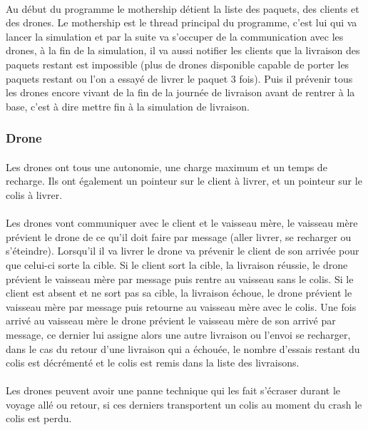\documentclass[article, backcover, french, nodocumentinfo]{upmethodology-document}
\begin{document}
				\paragraph*{}
					Au début du programme le mothership détient la liste des paquets, des clients et des drones. Le mothership est le thread principal du programme, c'est lui qui va lancer la simulation et par la suite va s'occuper de la communication avec les drones, à la fin de la simulation, il va aussi notifier les clients que la livraison des paquets restant est impossible (plus de drones disponible capable de porter les paquets restant ou l'on a essayé de livrer le paquet 3 fois). Puis il prévenir tous les drones encore vivant de la fin de la journée de livraison avant de rentrer à la base, c'est à dire mettre fin à la simulation de livraison.
			\subsubsection{Drone}
				\paragraph*{}
					Les drones ont tous une autonomie, une charge maximum et un temps de recharge. Ils ont également un pointeur sur le client à livrer, et un pointeur sur le colis à livrer.
				\paragraph*{}
					Les drones vont communiquer avec le client et le vaisseau mère, le vaisseau mère prévient le drone de ce qu'il doit faire par message (aller livrer, se recharger ou s'éteindre). Lorsqu'il il va livrer le drone va prévenir le client de son arrivée pour que celui-ci sorte la cible. Si le client sort la cible, la livraison réussie, le drone prévient le vaisseau mère par message puis rentre au vaisseau sans le colis. Si le client est absent et ne sort pas sa cible, la livraison échoue, le drone prévient le vaisseau mère par message puis retourne au vaisseau mère avec le colis. Une fois arrivé au vaisseau mère le drone prévient le vaisseau mère de son arrivé par message, ce dernier lui assigne alors une autre livraison ou l'envoi se recharger, dans le cas du retour d'une livraison qui a échouée, le nombre d'essais restant du colis est décrémenté et le colis est remis dans la liste des livraisons.
				\paragraph*{}
					Les drones peuvent avoir une panne technique qui les fait s'écraser durant le voyage allé ou retour, si ces derniers transportent un colis au moment du crash le colis est perdu.
\end{document}
